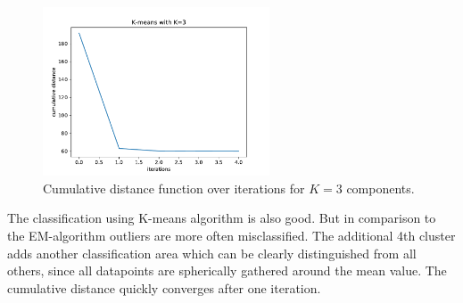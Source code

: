 \documentclass{article}
\begin{document}
\begin{figure}[!ht]
\centering
\includegraphics[width=0.6\textwidth]{./Figures/2_1_Kmeans_distance_K3}
\caption{Cumulative distance function over iterations for $K=3$ components.}
\label{2_1_Kmeans_distance}
\end{figure}

The classification using K-means algorithm is also good. But in comparison to the EM-algorithm outliers are more often misclassified. The additional 4th cluster adds another classification area which can be clearly distinguished from all others, since all datapoints are spherically gathered around the mean value.
The cumulative distance quickly converges after one iteration. 
 
\end{document}
